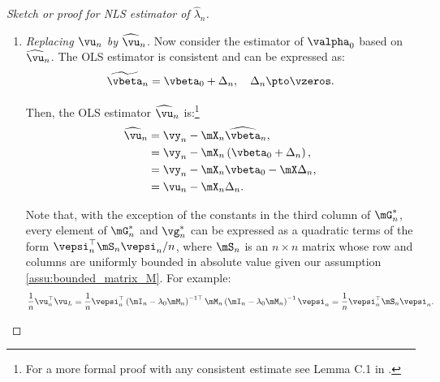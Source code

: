 \documentclass[english,12pt]{book}\usepackage[]{graphicx}\usepackage[]{xcolor}
\begin{document}
\begin{proof}[Sketch or proof for NLS estimator of $\widehat{\lambda}_n$]
\begin{enumerate}
Also:
\begin{equation*}
\begin{aligned}
\plim \vg_n^* &= \plim \mG^*_n\valpha_0, \\
 & = \mGamma_n\valpha_0.
 \end{aligned}
\end{equation*}

If $\vu_n$ would be observed, a linear GMM estimator for $\lambda_0$, say $\widetilde{\lambda}$,  would be the first element of the least squared estimator $\widetilde{\valpha}_n$, namely:
\begin{equation*}
  \widetilde{\valpha}_n= \mG_n^{-1*}\vg_n^*, 
\end{equation*}
%
since $\mG_n^{*}$ is a $3\times 3$ matrix which is nonsingular. Thus, using our previous results:
\begin{equation}\label{eq:consisten_error_gm}
  \plim \widetilde{\valpha}_n=\plim \mG_n^{-1*} \plim \vg_n^* = \mGamma_n^{-1}\vgamma_n = \valpha_0.
\end{equation}

\item \emph{Replacing $\vu_n$ by $\widehat{\vu}_n$}. Now consider the estimator of $\valpha_0$ based on $\widehat{\vu}_n$. The OLS estimator is consistent and can be expressed as:
\begin{equation*}
\widetilde{\vbeta}_n = \vbeta_0 + \Delta_n, \quad \Delta_n\pto \vzeros.
\end{equation*}

Then, the OLS estimator $\widehat{\vu}_n$ is:\footnote{For a more formal proof with any consistent estimate see Lemma C.1 in \cite{kelejian2010specification}.}
\begin{equation*}
\begin{aligned}
\widehat{\vu}_n & = \vy_n - \mX_n\widehat{\vbeta}_n,  \\
              & = \vy_n - \mX_n\left(\vbeta_0 + \Delta_n\right), \\
              & = \vy_n - \mX_n\vbeta_0 - \mX\Delta_n, \\
              & = \vu_n - \mX_n\Delta_n. 
\end{aligned}
\end{equation*}

Note that, with the exception of the constants in the third column of $\mG^*_n$, every element of $\mG^*_n$ and $\vg_n^*$ can be expressed as a quadratic terms of the form $\vepsi^\top_n\mS_n\vepsi_n/n$, where $\mS_n$ is an $n\times n$ matrix whose row and columns are uniformly bounded in absolute value given our assumption \ref{assu:bounded_matrix_M}. For example:
\begin{equation*}
      \frac{1}{n}\vu^\top_n\vu_L  = \frac{1}{n} \vepsi^{\top}_n\left(\mI_n - \lambda_0\mM_n\right)^{-1\top}\mM_n\left(\mI_n - \lambda_0\mM_n\right)^{-1}\vepsi_n = \frac{1}{n}\vepsi^\top_n\mS_n\vepsi_n.
\end{equation*}


\end{enumerate}
\end{proof}
\end{document}
